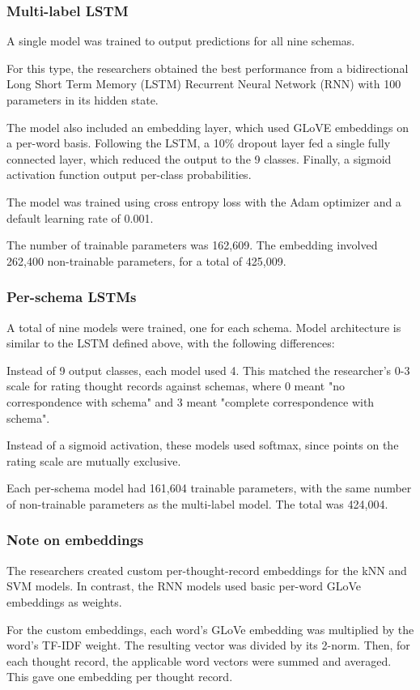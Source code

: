 \documentclass[11pt,a4paper]{article}
\begin{document}
\subsubsection{Multi-label LSTM}
A single model was trained to output predictions for all nine schemas.

For this type, the researchers obtained the best performance from a bidirectional Long Short Term Memory (LSTM) Recurrent Neural Network (RNN) with 100 parameters in its hidden state.

The model also included an embedding layer, which used GLoVE embeddings on a per-word basis. Following the LSTM, a 10\% dropout layer fed a single fully connected layer, which reduced the output to the 9 classes. Finally, a sigmoid activation function output per-class probabilities. 

The model was trained using cross entropy loss with the Adam optimizer and a default learning rate of 0.001.

The number of trainable parameters was 162,609. The embedding involved 262,400 non-trainable parameters, for a total of 425,009.

\subsubsection{Per-schema LSTMs}
A total of nine models were trained, one for each schema. Model architecture is similar to the LSTM defined above, with the following differences:

Instead of 9 output classes, each model used 4. This matched the researcher's 0-3 scale for rating thought records against schemas, where 0 meant "no correspondence with schema" and 3 meant "complete correspondence with schema".

Instead of a sigmoid activation, these models used softmax, since points on the rating scale are mutually exclusive.

Each per-schema model had 161,604 trainable parameters, with the same number of non-trainable parameters as the multi-label model. The total was 424,004.

\subsubsection{Note on embeddings}
The researchers created custom per-thought-record embeddings for the kNN and SVM models. In contrast, the RNN models used basic per-word GLoVe embeddings as weights.

For the custom embeddings, each word's GLoVe embedding was multiplied by the word's TF-IDF weight. The resulting vector was divided by its 2-norm. Then, for each thought record, the applicable word vectors were summed and averaged. This gave one embedding per thought record.
\end{document}
